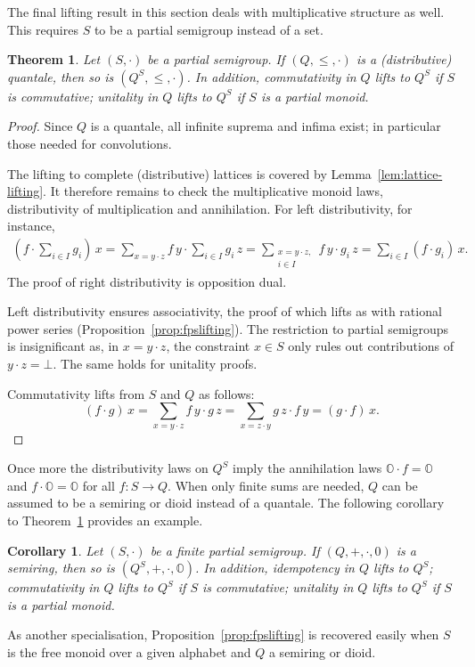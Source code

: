 \documentclass[12pt]{article}
\newtheorem{theorem}{Theorem}
\newtheorem{corollary}{Corollary}
\theoremstyle{definition}
\newcommand{\refprop}[1]{Proposition~\ref{#1}}
\newcommand{\refthm}[1]{Theorem~\ref{#1}}
\newcommand{\zero}{\mathbb{O}}
\begin{document}
The final lifting result in this section deals with multiplicative
structure as well. This requires $S$ to be a partial semigroup instead
of a set.
\begin{theorem}\label{thm:quantale-lifting} Let $(S,\cdot)$ be a 
  partial semigroup. If $(Q,\le,\cdot)$ is a (distributive) quantale,
  then so is $(Q^S,\le,\cdot)$. In addition, commutativity in $Q$
  lifts to $Q^S$ if $S$ is commutative; unitality in $Q$ lifts to 
  $Q^S$ if $S$ is a partial monoid. 
\end{theorem}
\begin{proof}
  Since $Q$ is a quantale, all infinite suprema and infima exist; in
  particular those needed for convolutions.

  The lifting to complete (distributive) lattices is covered by
  Lemma~\ref{lem:lattice-lifting}.  It therefore remains to check the
  multiplicative monoid laws, distributivity of multiplication and
  annihilation. For left distributivity, for instance,
    \begin{align*}
      (f\cdot \sum_{i\in I} g_i)\, x 
      = \sum_{x=y\cdot z} f\, y\cdot \sum_{i\in I} g_i\, z
      = \sum_{\substack{x=y\cdot z,\\ i\in I}} f\, y\cdot g_i\, z
      = \sum_{i\in I} (f\cdot g_i)\, x.
    \end{align*}
    The proof of right distributivity is opposition dual. 

    Left distributivity ensures associativity, the proof of which
    lifts as with rational power series
    (Proposition~\ref{prop:fpslifting}).  The restriction to partial
    semigroups is insignificant as, in $x= y\cdot z$, the constraint
    $x\in S$ only rules out contributions of $y\cdot z=\bot$. The same
    holds for unitality proofs.

    Commutativity lifts from $S$ and $Q$ as follows:
\begin{equation*}
 (f\cdot g)\, x = \sum_{x=y\cdot z} f\, y \cdot g\, z
  = \sum_{x=z\cdot y} g\, z \cdot f\, y =(g\cdot f)\, x.
\end{equation*}
\end{proof}

Once more the distributivity laws on $Q^S$ imply the annihilation laws
$\zero \cdot f= \zero$ and $f\cdot \zero = \zero$ for all $f:S\to Q$. When only finite
sums are needed, $Q$ can be assumed to be a semiring or dioid instead
of a quantale.  The following corollary to
\refthm{thm:quantale-lifting} provides an example.
\begin{corollary}\label{cor:quantale-lifting-finite} Let $(S,\cdot)$ be a finite
  partial semigroup. If $(Q,+,\cdot,0)$ is a semiring, then so is
  $(Q^S,+,\cdot,\zero)$. In addition, idempotency in $Q$ lifts to $Q^S$;
  commutativity in $Q$ lifts to $Q^S$ if $S$ is commutative; unitality
  in $Q$ lifts to $Q^S$ if $S$ is a partial monoid.
\end{corollary}
As another specialisation, \refprop{prop:fpslifting} is recovered
easily when $S$ is the free monoid over a given alphabet and $Q$ a
semiring or dioid.
\end{document}
